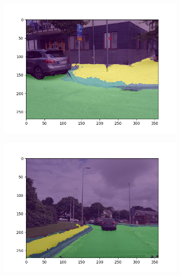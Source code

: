 \begin{figure}
	\centering
	\begin{subfigure}{.45\textwidth}
		\centering
		\includegraphics[width=\linewidth]{figures/experiments/results-mapillary/1.png}
		\caption[Mapillary Vistas Segmentation Result 1]{}
		\label{fig:mapresult-1}
	\end{subfigure}
	\hfill
	\begin{subfigure}{.45\textwidth}
		\centering
		\includegraphics[width=\linewidth]{figures/experiments/results-mapillary/2.png}
		\caption[Mapillary Vistas Segmentation Result 2]{}
		\label{fig:mapresult-2}
	\end{subfigure}
	
	\vspace{12pt}%
	

\end{figure}
